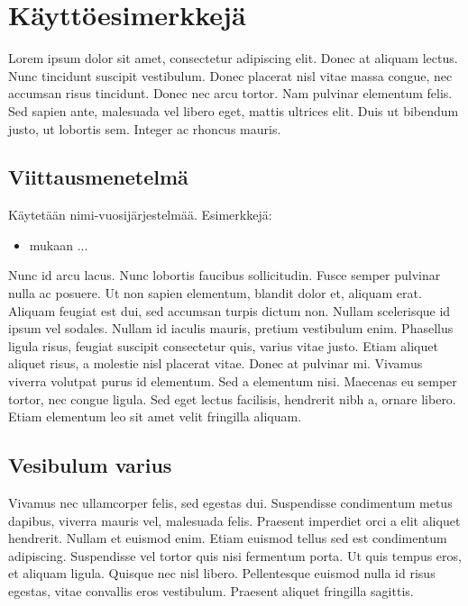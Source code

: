 \chapter{Käyttöesimerkkejä}
Lorem ipsum dolor sit amet, consectetur adipiscing elit. Donec at aliquam lectus. Nunc tincidunt suscipit vestibulum. Donec placerat nisl vitae massa congue, nec accumsan risus tincidunt. Donec nec arcu tortor. Nam pulvinar elementum felis. Sed sapien ante, malesuada vel libero eget, mattis ultrices elit. Duis ut bibendum justo, ut lobortis sem. Integer ac rhoncus mauris.

\section{Viittausmenetelmä}

Käytetään nimi-vuosijärjestelmää. Esimerkkejä:

\begin{itemize}
	\item \cite[s.~32]{book} mukaan ...
\end{itemize}

Nunc id arcu lacus. Nunc lobortis faucibus sollicitudin. Fusce semper pulvinar nulla ac posuere. Ut non sapien elementum, blandit dolor et, aliquam erat. Aliquam feugiat est dui, sed accumsan turpis dictum non. Nullam scelerisque id ipsum vel sodales. Nullam id iaculis mauris, pretium vestibulum enim. Phasellus ligula risus, feugiat suscipit consectetur quis, varius vitae justo. Etiam aliquet aliquet risus, a molestie nisl placerat vitae. Donec at pulvinar mi. Vivamus viverra volutpat purus id elementum. Sed a elementum nisi. Maecenas eu semper tortor, nec congue ligula. Sed eget lectus facilisis, hendrerit nibh a, ornare libero. Etiam elementum leo sit amet velit fringilla aliquam.

\section{Vesibulum varius}

Vivamus nec ullamcorper felis, sed egestas dui. Suspendisse condimentum metus dapibus, viverra mauris vel, malesuada felis. Praesent imperdiet orci a elit aliquet hendrerit. Nullam et euismod enim. Etiam euismod tellus sed est condimentum adipiscing. Suspendisse vel tortor quis nisi fermentum porta. Ut quis tempus eros, et aliquam ligula. Quisque nec nisl libero. Pellentesque euismod nulla id risus egestas, vitae convallis eros vestibulum. Praesent aliquet fringilla sagittis.


